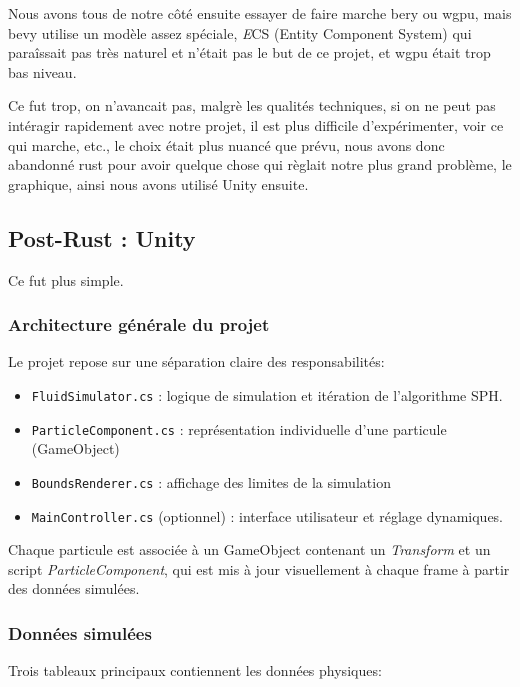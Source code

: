 \documentclass{article}
\begin{document}
Nous avons tous de notre côté ensuite essayer de faire marche bery ou wgpu, mais bevy utilise un modèle assez spéciale, {\emph ECS} (Entity Component System) qui paraîssait pas très naturel et n'était pas le but de ce projet, et wgpu était trop bas niveau.

Ce fut trop, on n'avancait pas, malgrè les qualités techniques, si on ne peut pas intéragir rapidement avec notre projet, il est plus difficile d'expérimenter, voir ce qui marche, etc., le choix était plus nuancé que prévu, nous avons donc abandonné rust pour avoir quelque chose qui règlait notre plus grand problème, le graphique, ainsi nous avons utilisé Unity ensuite.

\subsection{Post-Rust : Unity}

Ce fut plus simple.

\subsubsection{Architecture générale du projet}

Le projet repose sur une séparation claire des responsabilités:

\begin{itemize}
    \item \lstinline{FluidSimulator.cs} : logique de simulation et itération de l'algorithme SPH.
    \item \lstinline{ParticleComponent.cs} : représentation individuelle d'une particule (GameObject)
    \item \lstinline{BoundsRenderer.cs} : affichage des limites de la simulation
    \item \lstinline{MainController.cs} (optionnel) : interface utilisateur et réglage dynamiques.
\end{itemize}

Chaque particule est associée à un GameObject contenant un {\emph {Transform}} et un script {\emph {ParticleComponent}}, qui est mis à jour visuellement à chaque frame à partir des données simulées.

\subsubsection{Données simulées}

Trois tableaux principaux contiennent les données physiques:
\end{document}
